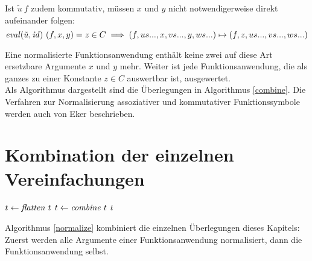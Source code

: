 Ist $\tilde u~f$ zudem kommutativ, müssen $x$ und $y$ nicht notwendigerweise direkt aufeinander folgen:
$$\mathit{eval}(\tilde u, \mathit{id})~(f, x, y) = z \in C \implies (f, us..., x, vs..., y, ws...) \mapsto (f, z, us..., vs..., ws...)$$

Eine normalisierte Funktionsanwendung enthält keine zwei auf diese Art ersetzbare Argumente $x$ und $y$ mehr. Weiter ist jede Funktionsanwendung, die als ganzes zu einer Konstante $z \in C$ auswertbar ist, ausgewertet.\\
Als Algorithmus dargestellt sind die Überlegungen in Algorithmus \ref{combine}. Die Verfahren zur Normalisierung assoziativer und kommutativer Funktionssymbole werden auch von Eker \cite{BipartiteGraphMatching} beschrieben.

\section{Kombination der einzelnen Vereinfachungen} \label{subsecKomboNormal}

\begin{algorithm}
\DontPrintSemicolon
\caption{$\Const{normalize} \colon T \rightarrow T$}\label{normalize}

$t \leftarrow \mathit{flatten}~t$\;
$t \leftarrow \mathit{combine}~t$\;
\Return $t$ 
\end{algorithm}
Algorithmus \ref{normalize} kombiniert die einzelnen Überlegungen dieses Kapitels: Zuerst werden alle Argumente einer Funktionsanwendung normalisiert, dann die Funktionsanwendung selbst.





